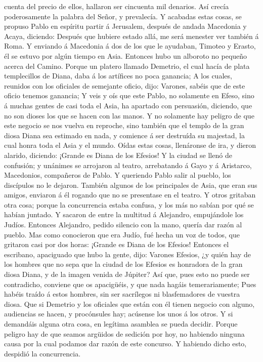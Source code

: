 cuenta del precio de ellos, hallaron ser cincuenta mil denarios.
 Así crecía poderosamente la palabra del Señor, y
prevalecía.  Y acabadas estas cosas, se propuso Pablo en
espíritu partir á Jerusalem, después de andada Macedonia y Acaya,
diciendo: Después que hubiere estado allá, me será menester ver también
á Roma.  Y enviando á Macedonia á dos de los que le
ayudaban, Timoteo y Erasto, él se estuvo por algún tiempo en Asia.
 Entonces hubo un alboroto no pequeño acerca del Camino.
 Porque un platero llamado Demetrio, el cual hacía de
plata templecillos de Diana, daba á los artífices no poca ganancia;
 A los cuales, reunidos con los oficiales de semejante
oficio, dijo: Varones, sabéis que de este oficio tenemos ganancia;
 Y veis y oís que este Pablo, no solamente en Efeso, sino
á muchas gentes de casi toda el Asia, ha apartado con persuasión,
diciendo, que no son dioses los que se hacen con las manos.
 Y no solamente hay peligro de que este negocio se nos
vuelva en reproche, sino también que el templo de la gran diosa Diana
sea estimado en nada, y comience á ser destruída su majestad, la cual
honra toda el Asia y el mundo.  Oídas estas cosas,
llenáronse de ira, y dieron alarido, diciendo: ¡Grande es Diana de los
Efesios!  Y la ciudad se llenó de confusión; y unánimes
se arrojaron al teatro, arrebatando á Gayo y á Aristarco, Macedonios,
compañeros de Pablo.  Y queriendo Pablo salir al pueblo,
los discípulos no le dejaron.  También algunos de los
principales de Asia, que eran sus amigos, enviaron á él rogando que no
se presentase en el teatro.  Y otros gritaban otra cosa;
porque la concurrencia estaba confusa, y los más no sabían por qué se
habían juntado.  Y sacaron de entre la multitud á
Alejandro, empujándole los Judíos. Entonces Alejandro, pedido silencio
con la mano, quería dar razón al pueblo.  Mas como
conocieron que era Judío, fué hecha un voz de todos, que gritaron casi
por dos horas: ¡Grande es Diana de los Efesios!  Entonces
el escribano, apaciguado que hubo la gente, dijo: Varones Efesios, ¿y
quién hay de los hombres que no sepa que la ciudad de los Efesios es
honradora de la gran diosa Diana, y de la imagen venida de Júpiter?
 Así que, pues esto no puede ser contradicho, conviene
que os apacigüéis, y que nada hagáis temerariamente; 
Pues habéis traído á estos hombres, sin ser sacrílegos ni blasfemadores
de vuestra diosa.  Que si Demetrio y los oficiales que
están con él tienen negocio con alguno, audiencias se hacen, y
procónsules hay; acúsense los unos á los otros.  Y si
demandáis alguna otra cosa, en legítima asamblea se pueda decidir.
 Porque peligro hay de que seamos argüidos de sedición
por hoy, no habiendo ninguna causa por la cual podamos dar razón de este
concurso. Y habiendo dicho esto, despidió la concurrencia.

